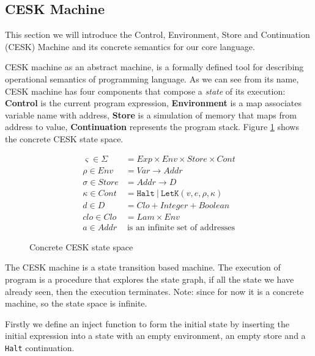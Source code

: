 \documentclass[paper=a4, fontsize=11pt]{scrartcl} %
\numberwithin{equation}{section} %
\numberwithin{figure}{section} %
\numberwithin{table}{section} %
\begin{document}

\subsection{CESK Machine}

This section we will introduce the Control, Environment, Store and Continuation (CESK) Machine\cite{felleisen1986control} and its concrete semantics for our core language.

CESK machine as an abstract machine, is a formally defined tool for describing operational semantics of programming language. As we can see from its name, CESK machine has four components that compose a \textit{state} of its execution: \textbf{Control} is the current program expression, \textbf{Environment} is a map associates variable name with address, \textbf{Store} is a simulation of memory that maps from address to value, \textbf{Continuation} represents the program stack. Figure \ref{fig:concretecesk} shows the concrete CESK state space. \\

\begin{figure}[h!]
\begin{align*}
\varsigma \in \Sigma & = Exp \times Env \times Store \times Cont \\
\rho \in Env & = Var \rightarrow Addr \\
\sigma \in Store & = Addr \rightarrow D \\
\kappa \in Cont & = \texttt{Halt} ~|~ \texttt{LetK}(v,e,\rho,\kappa) \\
d \in D & = Clo + Integer + Boolean \\
clo \in Clo & = Lam \times Env \\
a \in Addr & ~ \mbox{is an infinite set of addresses}
\end{align*}
\caption{Concrete CESK state space}
\label{fig:concretecesk}
\end{figure}

The CESK machine is a state transition based machine. The execution of program is a procedure that explores the state graph, if all the state we have already seen, then the execution terminates. Note: since for now it is a concrete machine, so the state space is infinite.

Firstly we define an inject function to form the initial state by inserting the initial expression into a state with an empty environment, an empty store and a \texttt{Halt} continuation.
\end{document}
